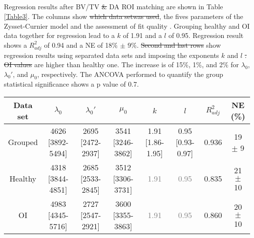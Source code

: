 \documentclass[a4paper,fleqn]{DC_ArtStyle}
\providecommand{\DIFadd}[1]{{\protect\color{blue}{#1}}} %
\providecommand{\DIFdel}[1]{{\protect\color{red}\sout{#1}}}                      %
\providecommand{\DIFaddbegin}{} %
\providecommand{\DIFaddend}{} %
\providecommand{\DIFdelbegin}{} %
\providecommand{\DIFdelend}{} %
\begin{document}
\DIFaddbegin \subsection{\DIFadd{BV/TV and DA Matching}}
\DIFaddend Regression results after BV/TV \DIFdelbegin \DIFdel{\& }\DIFdelend \DIFaddbegin \DIFadd{and }\DIFaddend DA ROI matching are shown in Table \ref{Table3}. The columns show \DIFdelbegin \DIFdel{which data setwas used}\DIFdelend \DIFaddbegin \DIFadd{the used data set}\DIFaddend , the fives parameters of the Zysset-Curnier model \DIFaddbegin \DIFadd{($\lambda_0$, $\lambda_0'$, $\mu_0$, $k$, and $l$) }\DIFaddend and the assessment of fit quality \DIFaddbegin \DIFadd{($R^2_{adj}$ and NE)}\DIFaddend . Grouping healthy and OI data together for regression lead to a $k$ of 1.91 and a $l$ of 0.95. Regression result shows a $R^2_{adj}$ of 0.94 and a NE of 18\% $\pm$ 9\%. \DIFdelbegin \DIFdel{Second and last rows }\DIFdelend \DIFaddbegin \DIFadd{The second and the last row }\DIFaddend show regression results using separated data sets and imposing the exponents $k$ and $l$ \DIFdelbegin \DIFdel{. OI values }\DIFdelend \DIFaddbegin \DIFadd{to fixed values. OI stiffness constants ($\lambda_0$, $\lambda_0'$, and $\mu_0$) }\DIFaddend are higher than healthy one. The increase is of 15\%, 1\%, and 2\% for $\lambda_0$, $\lambda_0'$, and $\mu_0$, respectively. The ANCOVA performed to quantify the group statistical significance shows a p value of 0.7.\\

\begin{table*}[b]
	\caption{Constants obtained with BV/TV and DA matched data sets. Comparison is performed between grouped (N ROIs = 166) and separated data sets (N ROIs = 83). Values are presented as value [95\% CI] or mean $\pm$ standard deviation. Values in gray were imposed in the regression.}
	\label{Table3}
	\begin{tabular}{cccccccc}
		\toprule
		Data set & $\lambda_0$ & $\lambda_0'$ & $\mu_0$ & $k$ & $l$ & $R^2_{adj}$ & NE (\%) \\
		\midrule
		Grouped & 4626 [3892-5494] & 2695 [2472-2937] & 3541 [3246-3862] & 1.91 [1.86-1.95] & 0.95 [0.93-0.97] & 0.936 & 19 $\pm$ 9\\

		Healthy & 4318 [3844-4851] & 2685 [2533-2845] & 3512 [3306-3731] & \textcolor{gray}{1.91} & \textcolor{gray}{0.95} & 0.835 & 21 $\pm$ 10\\

		OI & 4983 [4345-5716] & 2727 [2547-2921] & 3600 [3355-3863] & \textcolor{gray}{1.91} & \textcolor{gray}{0.95} & 0.860 & 20 $\pm$ 10\\
		\bottomrule
	\end{tabular}
\end{table*}
\end{document}
